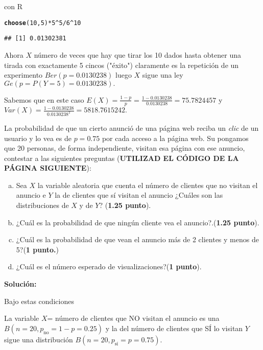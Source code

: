 \documentclass[12pt]{article}\usepackage[]{graphicx}\usepackage[]{color}
\makeatletter
\newcommand{\hlnum}[1]{\textcolor[rgb]{0.686,0.059,0.569}{#1}}%
\newcommand{\hlopt}[1]{\textcolor[rgb]{0,0,0}{#1}}%
\newcommand{\hlstd}[1]{\textcolor[rgb]{0.345,0.345,0.345}{#1}}%
\newcommand{\hlkwd}[1]{\textcolor[rgb]{0.737,0.353,0.396}{\textbf{#1}}}%
\newenvironment{kframe}{%
 \def\at@end@of@kframe{}%
 \ifinner\ifhmode%
  \def\at@end@of@kframe{\end{minipage}}%
  \begin{minipage}{\columnwidth}%
 \fi\fi%
 \def\FrameCommand##1{\hskip\@totalleftmargin \hskip-\fboxsep
 \colorbox{shadecolor}{##1}\hskip-\fboxsep
     \hskip-\linewidth \hskip-\@totalleftmargin \hskip\columnwidth}%
 \MakeFramed {\advance\hsize-\width
   \@totalleftmargin\z@ \linewidth\hsize
   \@setminipage}}%
 {\par\unskip\endMakeFramed%
 \at@end@of@kframe}
\newenvironment{knitrout}{}{} %
\newcounter{problemes}
\newcounter{punts} \def\thepunts{\arabic{punts}}
\def\probl{\addtocounter{problemes}{1} \setcounter{punts}{0}
\medskip\noindent{\bf \theproblemes) }}
\makeatother
\begin{document}
con R
\begin{knitrout}
\color{fgcolor}\begin{kframe}
\begin{alltt}
\hlkwd{choose}\hlstd{(}\hlnum{10}\hlstd{,}\hlnum{5}\hlstd{)}\hlopt{*}\hlnum{5}\hlopt{^}\hlnum{5}\hlopt{/}\hlnum{6}\hlopt{^}\hlnum{10}
\end{alltt}
\begin{verbatim}
## [1] 0.01302381
\end{verbatim}
\end{kframe}
\end{knitrout}




Ahora $X$ número de veces que hay que tirar los 10 dados hasta obtener una tirada con exactamente 5 cincos ("éxito")  claramente es la repetición de un experimento $Ber(p=0.0130238)$  luego $X$ sigue una ley $Ge(p=P(Y=5)=0.0130238).$

Sabemos que en este caso $E(X)=\frac{1-p}{p}=
\frac{1-0.0130238}{0.0130238}=75.7824457$ y  $Var(X)=\frac{1-0.0130238}{0.0130238^2}=5818.7615242.$

\probl La probabilidad de que un cierto anunció de una página web reciba un \textsl{clic}  de un usuario y lo vea  es de $p=0.75$ por cada acceso a la página web. Su pongamos que   20 personas, de forma independiente,  visitan esa página con ese anuncio,
contestar a las siguientes preguntas (\textbf{\textsc{UTILIZAD EL CÓDIGO DE LA PÁGINA SIGUIENTE}}):
\begin{enumerate}[a)]
\item Sea $X$ la variable aleatoria que cuenta el número de  clientes que no  visitan el anuncio  e $Y$ la de clientes que sí visitan el anuncio ¿Cuáles son las distribuciones de $X$ y  de $Y$? (\textbf{1.25 punto}).
\item ¿Cuál es la probabilidad de que ningún cliente vea el anuncio?.(\textbf{1.25 punto}).
\item ¿Cuál es la probabilidad de que vean el anuncio  más de 2 clientes  y menos de 5?(\textbf{1 punto.})
\item ¿Cuál es el número esperado de visualizaciones?(\textbf{1 punto}).
\end{enumerate}

\textbf{Solución:}

Bajo estas condiciones 

La variable $X$= número de clientes que NO visitan el anuncio es una $B(n=20,p_{\mbox{no}}=1-p=0.25)$ y la del número de clientes que SÍ lo visitan $Y$ sigue una distribución $B(n=20,p_{\mbox{sí}}=p=0.75)$.
\end{document}
